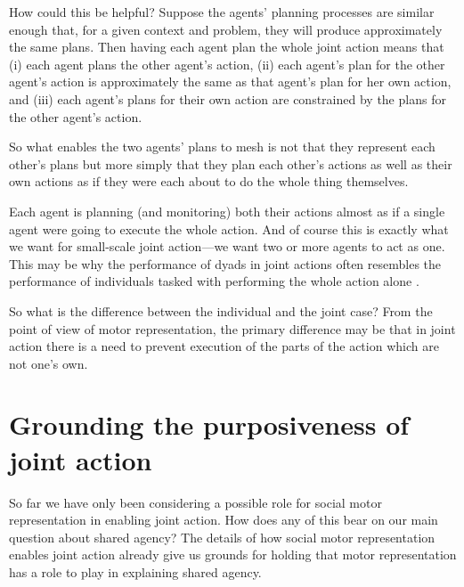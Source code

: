 \documentclass[12pt,\papersize]{extarticle}
\begin{document}
How could this be helpful?
Suppose the agents' planning processes are similar enough that, for a given context and problem, they will produce approximately the same plans.
Then having each agent plan the whole joint action means that (i) each agent plans the other agent's action,
(ii) each agent's plan for the other agent's action is approximately the same as that agent's plan for her own action,
and 
(iii) each  agent's plans for their own action are constrained by the plans for the other agent's action.

So what enables the two agents' plans to mesh is not that they represent each other's plans but more simply that they plan each other's actions as well as their own actions as if they were each about to do the whole thing themselves.

Each agent is planning (and monitoring) both their actions almost as if a single agent were going to execute the whole action.
And of course this is exactly what we want for small-scale joint action---we want two or more agents to act as one.
This may be why the performance of dyads in joint actions often resembles the performance of individuals tasked with performing the whole action alone \citep{Knoblich:2003nf}.

So what is the difference between the individual and the joint case?  From the point of view of motor representation, the primary difference may be that in joint action there is a need to prevent execution of the parts of the action which are not one’s own.



\section{Grounding the purposiveness of joint action}
So far we have only been considering a possible role for social motor representation in enabling joint action.  
How does any of this bear on our main question about shared agency?
The details of how 
social motor representation enables joint action
 already give us grounds for holding that motor representation has a role to play in explaining shared agency.
\end{document}
